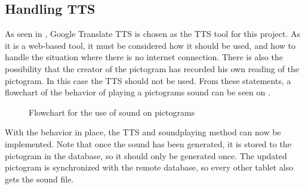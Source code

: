 \subsection{Handling TTS}%
As seen in , Google Translate TTS is chosen as the TTS tool for this project. As it is a web-based tool, it must be considered how it should be used, and how to handle the situation where there is no internet connection. There is also the possibility that the creator of the pictogram has recorded his own reading of the pictogram. In this case the TTS should not be used. From these statements, a flowchart of the behavior of playing a pictograms sound can be seen on .

\begin{savenotes}
\begin{figure}[H]
\caption{Flowchart for the use of sound on pictograms}
\label{fig:soundflow}
\end{figure}
\end{savenotes}

With the behavior in place, the TTS and soundplaying method can now be implemented. Note that once the sound has been generated, it is stored to the pictogram in the database, so it should only be generated once. The updated pictogram is synchronized with the remote database, so every other tablet also gets the sound file.